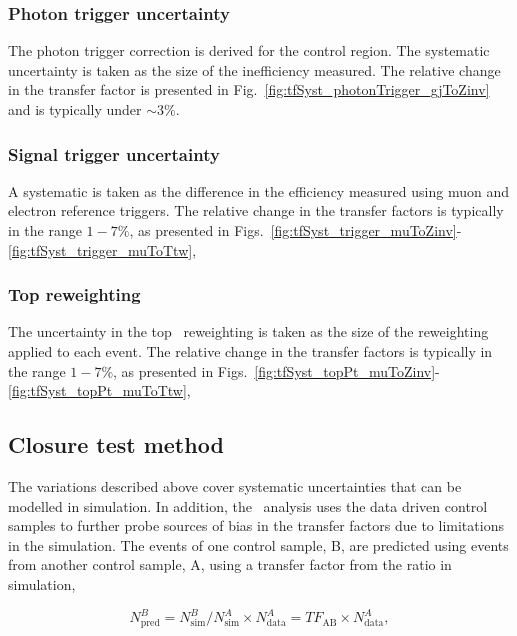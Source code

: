 \subsubsection{Photon trigger uncertainty}
\label{sec:tfSyst_pho}
The photon trigger correction is derived for the \gj control region. The systematic uncertainty is
taken as the size of the inefficiency measured. The relative change in the \gj transfer factor 
is presented in Fig.~\ref{fig:tfSyst_photonTrigger_gjToZinv} and is typically under $\sim3\%$.

\subsubsection{Signal trigger uncertainty}
\label{sec:tfSyst_trigger}

A systematic is taken as the difference in the efficiency measured using muon and 
electron reference triggers.
The relative change in the transfer factors is typically in the range
$1-7\%$, as presented in Figs.~\ref{fig:tfSyst_trigger_muToZinv}-\ref{fig:tfSyst_trigger_muToTtw}, 
\subsubsection{Top \pt reweighting}
\label{sec:topSyst}
The uncertainty in the top \pt~reweighting is taken as the size of the reweighting
applied to each event. The relative change in the transfer factors is typically in the range
$1-7\%$, as presented in Figs.~\ref{fig:tfSyst_topPt_muToZinv}-\ref{fig:tfSyst_topPt_muToTtw}, 

\subsection{Closure test method}
\label{sec:closure-tests}
The variations described above cover systematic uncertainties that can be modelled
in simulation. In addition, the \alphat~analysis uses the data driven control samples to
further probe sources of bias in the transfer factors due to limitations in the simulation.
The events of one control sample, B, are predicted using events from another control sample, A,
using a transfer factor from the ratio in simulation, 

\begin{equation}
\label{equ:abPred}
N^{B}_{\text{pred}} = N^{B}_{\text{sim}}/N^{A}_{\text{sim}} \times N^{A}_{\text{data}} = TF_{\text{AB}} \times N^{A}_{\text{data}},
\end{equation}


